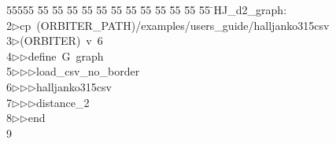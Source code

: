 %
%
\begin{tabbing}
55555 \= 55 \= 55 \= 55 \= 55 \= 55 \= 55 \= 55 \= 55 \= 55 \= 55 \= 55 \= 55 \= \>HJ\_d2\_graph:\\[0pt]
2\>$\triangleright$\>cp\ (ORBITER\_PATH)/examples/users\_guide/halljanko315csv\ \\[0pt]
3\>$\triangleright$\>(ORBITER)\ v\ 6\ \\[0pt]
4\>$\triangleright$\>$\triangleright$\>define\ G\ graph\ \\[0pt]
5\>$\triangleright$\>$\triangleright$\>$\triangleright$\>load\_csv\_no\_border\ \\[0pt]
6\>$\triangleright$\>$\triangleright$\>$\triangleright$\>halljanko315csv\ \\[0pt]
7\>$\triangleright$\>$\triangleright$\>$\triangleright$\>distance\_2\ \\[0pt]
8\>$\triangleright$\>$\triangleright$\>end\\[0pt]
9\>\end{tabbing}
